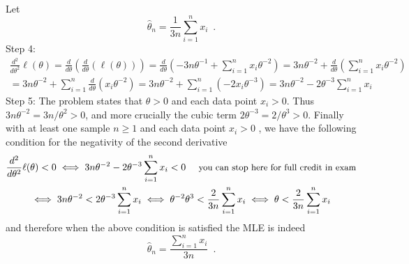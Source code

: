 \begin{Answer}
\begin{enumerate}
\begin{multline*}
\end{multline*}
Let $$\widehat{\theta}_n =  \frac{1}{3n} \sum_{i=1}^n x_i \enspace .$$
{\sf Step 4:}
\begin{multline*}
\frac{d^2}{d \theta^2} \ell(\theta) = \frac{d}{d \theta} \left( \frac{d}{d \theta} \left( \ell(\theta)\right)\right)
=  \frac{d}{d \theta} \left( - 3 n \theta^{-1} + \sum_{i=1}^n x_i \theta^{-2}\right)
=   3 n \theta^{-2} + \frac{d}{d \theta} \left(\sum_{i=1}^n x_i \theta^{-2}\right)\\
=   3 n \theta^{-2} + \sum_{i=1}^n \frac{d}{d \theta} \left( x_i \theta^{-2}\right)
=   3 n \theta^{-2} + \sum_{i=1}^n  \left( -2 x_i \theta^{-3}\right)
=   3 n \theta^{-2} - 2 \theta^{-3} \sum_{i=1}^n  x_i
\end{multline*}
{\sf Step 5:}
The problem states that $\theta > 0$ and each data point $x_i>0$.  
Thus $3 n \theta^{-2}=3n/\theta^2 > 0$, and more crucially the cubic term $2 \theta^{-3}=2/\theta^3 > 0$.  
Finally with at least one sample $n \geq 1$ and each data point $x_i>0$ , we have the following condition for the negativity of the second derivative 
\begin{multline*}
\frac{d^2}{d \theta^2} \ell(\theta) <0
\iff
3 n \theta^{-2} - 2 \theta^{-3} \sum_{i=1}^n  x_i  < 0 \quad {\text{ \small you can stop here for full credit in exam}}\\
\iff
3 n \theta^{-2} < 2 \theta^{-3} \sum_{i=1}^n  x_i  
\iff
\theta^{-2}\theta^3 < \frac{2}{3n} \sum_{i=1}^n  x_i  
\iff
\theta < \frac{2}{3n} \sum_{i=1}^n  x_i  
\end{multline*}
and therefore when the above condition is satisfied the MLE is indeed
$$\widehat{\theta}_n = \frac{\sum_{i=1}^n x_i}{3n} \enspace .$$


\end{enumerate}
\end{Answer}
